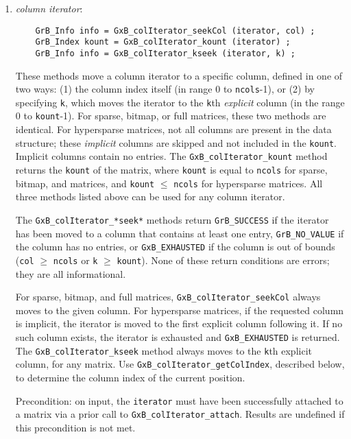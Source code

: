 \documentclass[12pt]{article}
\begin{document}
\begin{enumerate}
    \item {\em column iterator}: 
    {\footnotesize
    \begin{verbatim}
    GrB_Info info = GxB_colIterator_seekCol (iterator, col) ;
    GrB_Index kount = GxB_colIterator_kount (iterator) ;
    GrB_Info info = GxB_colIterator_kseek (iterator, k) ; \end{verbatim}}

        These methods move a column iterator to a specific column, defined in
        one of two ways: (1) the column index itself (in range 0 to
        \verb'ncols'-1), or (2) by specifying \verb'k', which moves the
        iterator to the \verb'k'th {\em explicit} column (in the range 0 to
        \verb'kount'-1). For sparse, bitmap, or full matrices, these two
        methods are identical.  For hypersparse matrices, not all columns are
        present in the data structure; these {\em implicit} columns are skipped
        and not included in the \verb'kount'.  Implicit columns contain no
        entries.  The \verb'GxB_colIterator_kount' method returns the
        \verb'kount' of the matrix, where \verb'kount' is equal to \verb'ncols'
        for sparse, bitmap, and matrices, and \verb'kount' $\le$ \verb'ncols'
        for hypersparse matrices.  All three methods listed above can be used
        for any column iterator.

        The \verb'GxB_colIterator_*seek*' methods return \verb'GrB_SUCCESS' if
        the iterator has been moved to a column that contains at least one
        entry, \verb'GrB_NO_VALUE' if the column has no entries, or
        \verb'GxB_EXHAUSTED' if the column is out of bounds (\verb'col' $\ge$
        \verb'ncols' or \verb'k' $\ge$ \verb'kount').
        None of these return conditions are
        errors; they are all informational.

        For sparse, bitmap, and full matrices, \verb'GxB_colIterator_seekCol'
        always moves to the given column.  For hypersparse matrices, if the
        requested column is implicit, the iterator is moved to the first
        explicit column following it.  If no such column exists, the iterator
        is exhausted and \verb'GxB_EXHAUSTED' is returned.
        The \verb'GxB_colIterator_kseek' method always moves to the \verb'k'th
        explicit column, for any matrix.
        Use \verb'GxB_colIterator_getColIndex', described below, to determine
        the column index of the current position.

        Precondition: on input, the \verb'iterator' must have been successfully
        attached to a matrix via a prior call to \verb'GxB_colIterator_attach'.
        Results are undefined if this precondition is not met.


\end{enumerate}
\end{document}
